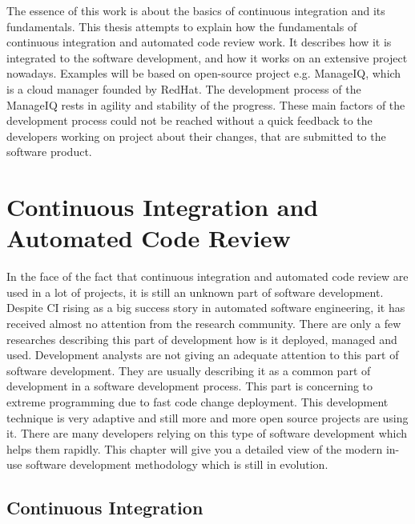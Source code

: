 The essence of this work is about the basics of continuous integration and its fundamentals. This thesis attempts to explain how the fundamentals of continuous integration and automated code review work. It describes how it is integrated to the software development, and how it works on an extensive project nowadays. Examples will be based on open-source project e.g. ManageIQ, which is a cloud manager founded by RedHat. The development process of the ManageIQ rests in agility and stability of the progress. These main factors of the development process could not be reached without a quick feedback to the developers working on project about their changes, that are submitted to the software product.

\chapter{Continuous Integration and Automated Code Review}

In the face of the fact that continuous integration and automated code review are used in a lot of projects, it is still an unknown part of software development. Despite CI rising as a big success story in automated software engineering, it has received almost no attention from the research community\cite{COPE}. There are only a few researches describing this part of development how is it deployed, managed and used. Development analysts are not giving an adequate attention to this part of software development. They are usually describing it as a common part of development in a software development process. This part is concerning to extreme programming due to fast code change deployment. This development technique is very adaptive and still more and more open source projects are using it. There are many developers relying on this type of software development which helps them rapidly. This chapter will give you a detailed view of the modern in-use software development methodology which is still in evolution.

\section{Continuous Integration}

